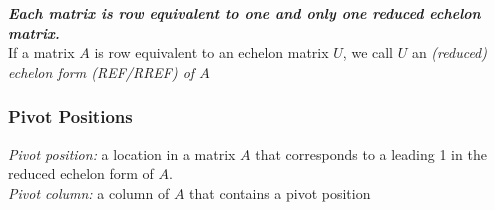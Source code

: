 \documentclass[12pt]{article} %
\begin{document}
\textbf{\emph{Each matrix is row equivalent to one and only one reduced echelon matrix.}}\\

If a matrix $A$ is row equivalent to an echelon matrix $U$, we call $U$ an \emph{(reduced) echelon form (REF/RREF) of $A$}\\

\subsubsection{Pivot Positions}
\emph{Pivot position:} a location in a matrix $A$ that corresponds to a leading 1 in the reduced echelon form of $A$.\\

\emph{Pivot column:} a column of $A$ that contains a pivot position\\
\end{document}
